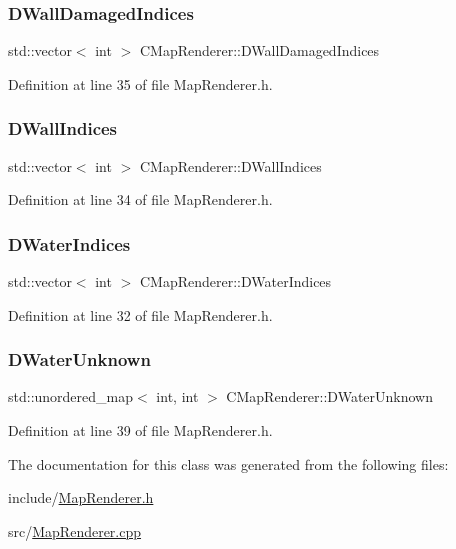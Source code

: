 \subsubsection{\texorpdfstring{D\+Wall\+Damaged\+Indices}{DWallDamagedIndices}}
{\footnotesize\ttfamily std\+::vector$<$ int $>$ C\+Map\+Renderer\+::\+D\+Wall\+Damaged\+Indices\hspace{0.3cm}{\ttfamily [protected]}}



Definition at line 35 of file Map\+Renderer.\+h.

\hypertarget{classCMapRenderer_a5ba880d6fb399fc678321cb1daa2e856}{}\label{classCMapRenderer_a5ba880d6fb399fc678321cb1daa2e856} 
\subsubsection{\texorpdfstring{D\+Wall\+Indices}{DWallIndices}}
{\footnotesize\ttfamily std\+::vector$<$ int $>$ C\+Map\+Renderer\+::\+D\+Wall\+Indices\hspace{0.3cm}{\ttfamily [protected]}}



Definition at line 34 of file Map\+Renderer.\+h.

\hypertarget{classCMapRenderer_af82295ac61f841481490da6f2b433db2}{}\label{classCMapRenderer_af82295ac61f841481490da6f2b433db2} 
\subsubsection{\texorpdfstring{D\+Water\+Indices}{DWaterIndices}}
{\footnotesize\ttfamily std\+::vector$<$ int $>$ C\+Map\+Renderer\+::\+D\+Water\+Indices\hspace{0.3cm}{\ttfamily [protected]}}



Definition at line 32 of file Map\+Renderer.\+h.

\hypertarget{classCMapRenderer_a4b2db86f9cb097d28e0bb3b29eb90194}{}\label{classCMapRenderer_a4b2db86f9cb097d28e0bb3b29eb90194} 
\subsubsection{\texorpdfstring{D\+Water\+Unknown}{DWaterUnknown}}
{\footnotesize\ttfamily std\+::unordered\+\_\+map$<$ int, int $>$ C\+Map\+Renderer\+::\+D\+Water\+Unknown\hspace{0.3cm}{\ttfamily [protected]}}



Definition at line 39 of file Map\+Renderer.\+h.



The documentation for this class was generated from the following files\+:\begin{DoxyCompactItemize}
\item 
include/\hyperlink{MapRenderer_8h}{Map\+Renderer.\+h}\item 
src/\hyperlink{MapRenderer_8cpp}{Map\+Renderer.\+cpp}\end{DoxyCompactItemize}
